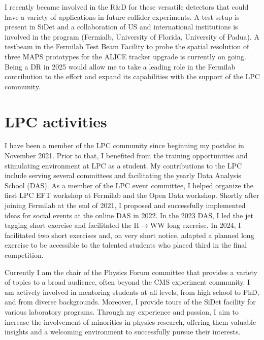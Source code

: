 {\begin{flushleft}
I recently became involved in the R\&D for these versatile detectors that could have a variety of applications in future collider experiments. A test setup is present in SiDet and a collaboration of US and international institutions is involved in the program (Fermialb, University of Florida, University of Padua). A testbeam in the Fermilab Test Beam Facility to probe the spatial resolution of three MAPS prototypes for the ALICE tracker upgrade is currently on going. 
Being a DR in 2025 would allow me to take a leading role in the Fermilab contribution to the effort and expand its capabilities with the support of the LPC community.


 
\section{LPC activities}
\vspace{\baselineskip}
I have been a member of the LPC community since beginning my postdoc in November 2021. Prior to that, I benefited from the training opportunities and stimulating environment at LPC as a student.
My contributions to the LPC include serving several committees and facilitating the yearly Data Analysis School (DAS). 
As a member of the LPC event committee, I helped organize the first LPC EFT workshop at Fermilab and the Open Data workshop. 
Shortly after joining Fermilab at the end of 2021, I proposed and successfully implemented ideas for social events at the online DAS in 2022.
In the 2023 DAS, I led the jet tagging short exercise and facilitated the H$\to$WW long exercise. In 2024, I facilitated two short exercises and, on very short notice, adapted a planned long exercise to be accessible to the talented students who placed third in the final competition.

Currently I am the chair of the Physics Forum committee that provides a variety of topics to a broad audience, often beyond the CMS experiment community. 
I am actively involved in mentoring students at all levels, from high school to PhD, and from diverse backgrounds. Moreover, I provide tours of the SiDet facility for various laboratory programs. Through my experience and passion, I aim to increase the involvement of minorities in physics research, offering them valuable insights and a welcoming environment to successfully pursue their interests.




\end{flushleft}}
